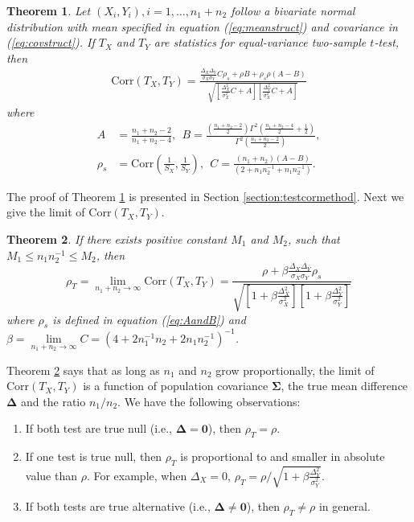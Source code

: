 \documentclass[12pt, a4paper]{article}
\newtheorem{theorem}{Theorem}       %
\newcommand{\cor}{\text{Corr}}
\begin{document}
	\begin{theorem}\label{thm:tstat}
		Let $(X_i, Y_i), i = 1, \ldots, n_1 + n_2$ follow a bivariate normal distribution with mean specified in equation (\ref{eq:meanstruct}) and covariance in (\ref{eq:covstruct}). If $T_X$ and $T_Y$ are statistics for equal-variance two-sample $t$-test, then 
		\begin{equation}\label{eq:ttestcor}
	\begin{aligned}
	 \cor(T_X, T_Y) =   
	 \frac{\frac{\Delta_X\Delta_Y}{\sigma_X\sigma_Y}C \rho_{s}+ \rho B
		+ \rho_{s}\rho(A-B)}{\sqrt{\left[ \frac{\Delta_X^2}{\sigma_X^2}C + A\right]\left[\frac{\Delta_Y^2}{\sigma_X^2}C +   A\right]}}
	\end{aligned}
		\end{equation}
	where 
			 \begin{equation}\label{eq:AandB}
			 	 \begin{aligned}
			 	 A & = \frac{n_1 + n_2-2}{n_1 + n_2-4}, ~~B =
			 	 \frac{(\frac{n_1 + n_2 -2}{2})\Gamma^2(\frac{n_1 + n_2 -4}{2} + \frac{1}{2})}{\Gamma^2(\frac{n_1+ n_2 -2}{2})}, \\
			 	 \rho_s & = \cor(\frac{1}{S_X}, \frac{1}{S_Y}), ~~ 
			 	 C = \frac{(n_1 + n_2)(A-B)}{(2 + n_1n_2^{-1} + n_1n_2^{-1})}.
			 	 \end{aligned}
			 \end{equation}	 
	\end{theorem}
	The proof of Theorem \ref{thm:tstat} is presented in Section \ref{section:testcormethod}. Next we give the limit of $\cor(T_X, T_Y)$.
	\begin{theorem}\label{thm:rholimit}
	  	If there exists positive constant $M_1$ and $M_2$, such that $M_1 \leq n_1n_2^{-1}\leq M_2$, then
	   \begin{equation}\label{limitT}
	   \rho_T=\lim\limits_{n_1 + n_2 \rightarrow \infty} \cor(T_X, T_Y) = \frac{\rho +
	   	\beta\frac{\Delta_X\Delta_Y}{\sigma_X\sigma_Y}\rho_{s}}{\sqrt{  \left[ 1 +\beta\frac{\Delta_X^2}{\sigma_X^2}\right]\left[ 1 + \beta\frac{\Delta_Y^2}{\sigma_Y^2}\right]}}
	   \end{equation}
	   where $\rho_{s}$ is defined in equation (\ref{eq:AandB}) and $\beta = \lim\limits_{n_1 + n_2 \rightarrow \infty}C = (4 + 2n_1^{-1}n_2 + 2n_1n_2^{-1})^{-1}$.
	\end{theorem}
	Theorem \ref{thm:rholimit} says that as long as $n_1$ and $n_2$ grow proportionally, the limit of $\cor(T_X, T_Y)$ is a function of population covariance $\bm \Sigma$, the true mean difference $\bm \Delta$ and the ratio $n_1/n_2$. We have the following observations:
	\begin{enumerate}
		\item If both test are true null (i.e., $\bm \Delta = \bm 0$), then $\rho_T = \rho$.
		\item If one test is true null, then $\rho_T$ is proportional to and smaller in absolute value than $\rho$. For example, when $\Delta_X=0$, $\rho_T = \rho /\sqrt{1 + \beta \frac{\Delta_Y^2}{\sigma_Y^2}}$. 
		\item If both tests are true alternative (i.e., $\bm \Delta \neq \bm 0$), then $\rho_T\neq \rho$ in general.
	\end{enumerate}
	
\end{document}
